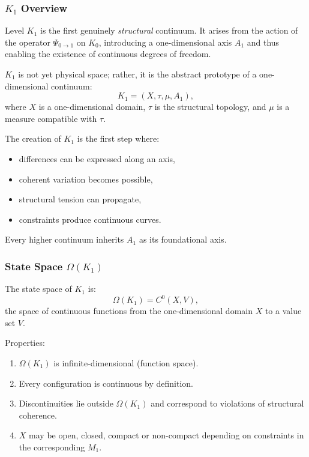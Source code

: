 

\subsubsection{\texorpdfstring{$K_1$}{K_1} Overview}
\label{sec:k1-overview}

Level $K_1$ is the first genuinely \emph{structural} continuum.
It arises from the action of the operator $\Psi_{0\to1}$ on $K_0$,
introducing a one-dimensional axis $A_1$ and thus enabling the existence
of continuous degrees of freedom.

$K_1$ is not yet physical space; rather, it is the abstract prototype of
a one-dimensional continuum:
\[
K_1 = (X, \tau, \mu, A_1),
\]
where $X$ is a one-dimensional domain, $\tau$ is the structural
topology, and $\mu$ is a measure compatible with $\tau$.

The creation of $K_1$ is the first step where:
\begin{itemize}
    \item differences can be expressed along an axis,
    \item coherent variation becomes possible,
    \item structural tension can propagate,
    \item constraints produce continuous curves.
\end{itemize}

Every higher continuum inherits $A_1$ as its foundational axis.

\subsubsection{State Space \texorpdfstring{$\Omega(K_1)$}{\Omega(K_1)}}

The state space of $K_1$ is:
\[
\Omega(K_1) = C^0(X, V),
\]
the space of continuous functions from the one-dimensional domain $X$
to a value set $V$.

Properties:
\begin{enumerate}
    \item $\Omega(K_1)$ is infinite-dimensional (function space).
    \item Every configuration is continuous by definition.
    \item Discontinuities lie outside $\Omega(K_1)$ and correspond to
          violations of structural coherence.
    \item $X$ may be open, closed, compact or non-compact depending on
          constraints in the corresponding $M_1$.
\end{enumerate}

